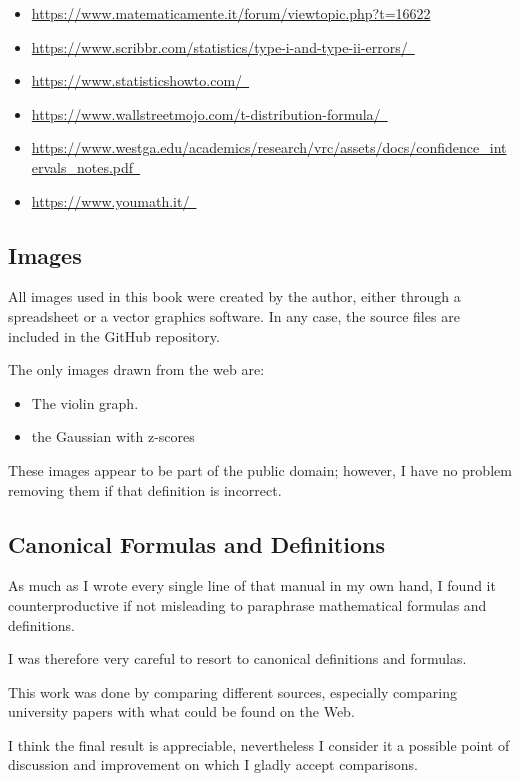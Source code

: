 \documentclass{article}
\begin{document}
\begin{sloppypar}
\begin{itemize}
    \item \url{https://www.matematicamente.it/forum/viewtopic.php?t=16622}
    \item \url{https://www.scribbr.com/statistics/type-i-and-type-ii-errors/ }
    \item \url{https://www.statisticshowto.com/ }
    \item \url{https://www.wallstreetmojo.com/t-distribution-formula/ }
    \item \url{https://www.westga.edu/academics/research/vrc/assets/docs/confidence_intervals_notes.pdf }
    \item \url{https://www.youmath.it/ }
\end{itemize}
\end{sloppypar}

\subsection{Images}
All images used in this book were created by the author, either through a spreadsheet or a vector graphics software. 
In any case, the source files are included in the GitHub repository.

The only images drawn from the web are:
\begin{itemize}
    \item The violin graph.
    \item the Gaussian with z-scores
\end{itemize}

These images appear to be part of the public domain; however, I have no problem removing them if that definition is incorrect. 

\subsection{Canonical Formulas and Definitions}
As much as I wrote every single line of that manual in my own hand, I found it counterproductive if not misleading to paraphrase mathematical formulas and definitions. 

I was therefore very careful to resort to canonical definitions and formulas. 

This work was done by comparing different sources, especially comparing university papers with what could be found on the Web.

I think the final result is appreciable, nevertheless I consider it a possible point of discussion and improvement on which I gladly accept comparisons.
\end{document}
